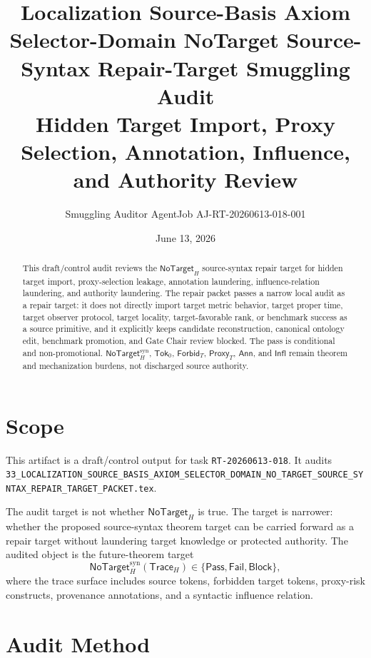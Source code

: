 \documentclass[11pt]{article}
\title{\textbf{Localization Source-Basis Axiom Selector-Domain NoTarget Source-Syntax Repair-Target Smuggling Audit}\\[0.35em]
\large Hidden Target Import, Proxy Selection, Annotation, Influence, and Authority Review}
\author{Smuggling Auditor AgentJob AJ-RT-20260613-018-001}
\date{June 13, 2026}
\newcommand{\NoTargetH}{\mathsf{NoTarget}_{H}}
\newcommand{\NoTargetSyn}{\mathsf{NoTarget}_{H}^{\mathrm{syn}}}
\newcommand{\SrcTok}{\mathsf{Tok}_{0}}
\newcommand{\ForbidT}{\mathsf{Forbid}_{T}}
\newcommand{\ProxyT}{\mathsf{Proxy}_{T}}
\newcommand{\TraceH}{\mathsf{Trace}_{H}}
\newcommand{\Annot}{\mathsf{Ann}}
\newcommand{\Influence}{\mathsf{Infl}}
\newcommand{\Pass}{\mathsf{Pass}}
\newcommand{\Fail}{\mathsf{Fail}}
\newcommand{\Block}{\mathsf{Block}}
\begin{document}
\maketitle

\begin{abstract}
This draft/control audit reviews the \(\NoTargetH\) source-syntax repair
target for hidden target import, proxy-selection leakage, annotation
laundering, influence-relation laundering, and authority laundering. The
repair packet passes a narrow local audit as a repair target: it does not
directly import target metric behavior, target proper time, target observer
protocol, target locality, target-favorable rank, or benchmark success as a
source primitive, and it explicitly keeps candidate reconstruction,
canonical ontology edit, benchmark promotion, and Gate Chair review blocked.
The pass is conditional and non-promotional. \(\NoTargetSyn\), \(\SrcTok\),
\(\ForbidT\), \(\ProxyT\), \(\Annot\), and \(\Influence\) remain theorem
and mechanization burdens, not discharged source authority.
\end{abstract}

\section{Scope}

This artifact is a draft/control output for task \texttt{RT-20260613-018}.
It audits
\texttt{33\_LOCALIZATION\_SOURCE\_BASIS\_AXIOM\_SELECTOR\_DOMAIN\_NO\_TARGET\_SOURCE\_SYNTAX\_REPAIR\_TARGET\_PACKET.tex}.

The audit target is not whether \(\NoTargetH\) is true. The target is
narrower: whether the proposed source-syntax theorem target can be carried
forward as a repair target without laundering target knowledge or protected
authority. The audited object is the future-theorem target
\[
    \NoTargetSyn(\TraceH) \in \{\Pass,\Fail,\Block\},
\]
where the trace surface includes source tokens, forbidden target tokens,
proxy-risk constructs, provenance annotations, and a syntactic influence
relation.

\section{Audit Method}
\end{document}
